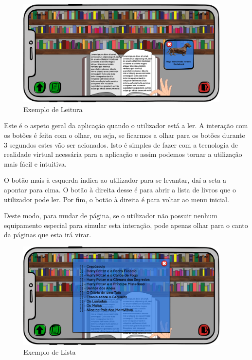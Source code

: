 \documentclass[11pt]{article}
\begin{document}
	\begin{figure}[H]
		\includegraphics[width=0.95\textwidth,height=0.25\textheight,keepaspectratio]{biblio-ler}
		\centering
		\caption{Exemplo de Leitura}
		\label{fig:leitura}
	\end{figure}

	Este é o aspeto geral da aplicação quando o utilizador está a ler. A interação com os botões é feita com o olhar, ou seja, se ficarmos a olhar para os botões durante 3 segundos estes vão ser acionados. Isto é simples de fazer com a tecnologia de realidade virtual ncessária para a aplicação e assim podemos tornar a utilização mais fácil e intuitiva.
	
	O botão mais à esquerda indica ao utilizador para se levantar, daí a seta a apontar para cima. O botão à direita desse é para abrir a lista de livros que o utilizador pode ler. Por fim, o botão à direita é para voltar ao menu inicial.
	
	Deste modo, para mudar de página, se o utilizador não possuir nenhum equipamento especial para simular esta interação, pode apenas olhar para o canto da páginas que esta irá virar.
	
	\begin{figure}[H]
		\includegraphics[width=0.95\textwidth,height=0.25\textheight,keepaspectratio]{biblio-escolher-lista}
		\centering
		\caption{Exemplo de Lista}
		\label{fig:lista}
	\end{figure}
	
\end{document}
